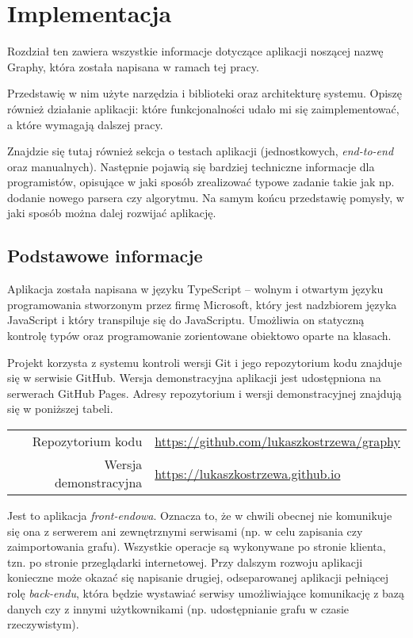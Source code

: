 \chapter{Implementacja}

Rozdział ten zawiera wszystkie informacje dotyczące aplikacji noszącej nazwę Graphy, która została napisana w ramach tej pracy. 

Przedstawię w nim użyte narzędzia i biblioteki oraz architekturę systemu. Opiszę również działanie aplikacji: które funkcjonalności udało mi się zaimplementować, a które wymagają dalszej pracy. 

Znajdzie się tutaj również sekcja o testach aplikacji (jednostkowych, \textit{end-to-end} oraz manualnych). Następnie pojawią się bardziej techniczne informacje dla programistów, opisujące w jaki sposób zrealizować typowe zadanie takie jak np. dodanie nowego parsera czy algorytmu. Na samym końcu przedstawię pomysły, w jaki sposób można dalej rozwijać aplikację.

\section{Podstawowe informacje}

Aplikacja została napisana w języku TypeScript -- wolnym i otwartym języku programowania stworzonym przez firmę Microsoft, który jest nadzbiorem języka JavaScript i który transpiluje się do JavaScriptu. Umożliwia on statyczną kontrolę typów oraz programowanie zorientowane obiektowo oparte na klasach.

Projekt korzysta z systemu kontroli wersji Git i jego repozytorium kodu znajduje się w serwisie GitHub. Wersja demonstracyjna aplikacji jest udostępniona na serwerach GitHub Pages. Adresy repozytorium i wersji demonstracyjnej znajdują się w poniższej tabeli.

\bigskip\bigskip
\noindent\begin{tabularx}{\textwidth}{r|X|}
\cline{2-2}
  Repozytorium kodu & \href{https://github.com/lukaszkostrzewa/graphy}{https://github.com/lukaszkostrzewa/graphy} \\ 
\cline{2-2} 
 Wersja demonstracyjna & \href{https://lukaszkostrzewa.github.io}{https://lukaszkostrzewa.github.io} \\ 
\cline{2-2}
\end{tabularx} 
\bigskip\bigskip

Jest to aplikacja \textit{front-endowa}. Oznacza to, że w chwili obecnej nie komunikuje się ona z serwerem ani zewnętrznymi serwisami (np. w celu zapisania czy zaimportowania grafu). Wszystkie operacje są wykonywane po stronie klienta, tzn. po stronie przeglądarki internetowej. Przy dalszym rozwoju aplikacji konieczne może okazać się napisanie drugiej, odseparowanej aplikacji pełniącej rolę \textit{back-endu}, która będzie wystawiać serwisy umożliwiające komunikację z bazą danych czy z innymi użytkownikami (np. udostępnianie grafu w czasie rzeczywistym).

